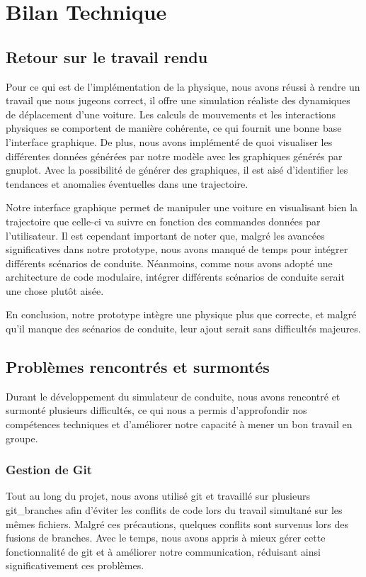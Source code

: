 \section{Bilan Technique}\label{sec:bilan-technique}

\subsection{Retour sur le travail rendu}\label{subsec:retour-sur-le-travail-rendu}
Pour ce qui est de l'implémentation de la physique, nous avons réussi à rendre un travail que nous jugeons correct, il offre une simulation réaliste des dynamiques de déplacement d'une voiture.
Les calculs de mouvements et les interactions physiques se comportent de manière cohérente, ce qui fournit une bonne base l'interface graphique.
De plus, nous avons implémenté de quoi visualiser les différentes données générées par notre modèle avec les graphiques générés par \gls{gnuplot}.
Avec la possibilité de générer des graphiques, il est aisé d'identifier les tendances et anomalies éventuelles dans une trajectoire.

Notre interface graphique permet de manipuler une voiture en visualisant bien la trajectoire que celle-ci va suivre en fonction des commandes données par l'utilisateur.
Il est cependant important de noter que, malgré les avancées significatives dans notre prototype, nous avons manqué de temps pour intégrer différents scénarios de conduite.
Néanmoins, comme nous avons adopté une architecture de code modulaire, intégrer différents scénarios de conduite serait une chose plutôt aisée.

En conclusion, notre prototype intègre une physique plus que correcte, et malgré qu'il manque des scénarios de conduite, leur ajout serait sans difficultés majeures.

\subsection{Problèmes rencontrés et surmontés}\label{subsec:problemes-rencontres-et-surmontes} %
Durant le développement du simulateur de conduite, nous avons rencontré et surmonté plusieurs difficultés, ce qui nous a permis d'approfondir nos compétences techniques et d'améliorer notre capacité à mener un bon travail en groupe.

\subsubsection{Gestion de Git}\label{subsubsec:git}
Tout au long du projet, nous avons utilisé \gls{git} et travaillé sur plusieurs \gls{git_branches} afin d'éviter les conflits de code lors du travail simultané sur les mêmes fichiers.
Malgré ces précautions, quelques conflits sont survenus lors des fusions de branches.
Avec le temps, nous avons appris à mieux gérer cette fonctionnalité de \gls{git} et à améliorer notre communication, réduisant ainsi significativement ces problèmes.

